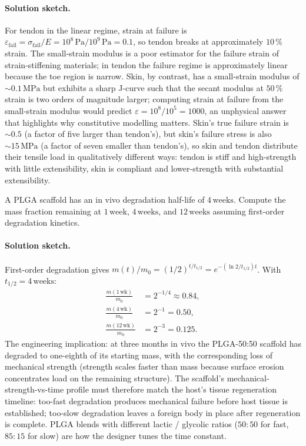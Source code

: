 \paragraph{Solution sketch.} For tendon in the linear regime, strain
at failure is $\varepsilon_{\text{fail}} = \sigma_{\text{fail}}/E
= 10^{8}\,\text{Pa} / 10^{9}\,\text{Pa} = 0.1$, so tendon breaks at
approximately $10\,\%$ strain. The small-strain modulus is a poor
estimator for the failure strain of strain-stiffening materials;
in tendon the failure regime is approximately linear because the
toe region is narrow. Skin, by contrast, has a small-strain modulus
of $\sim 0.1\,\text{MPa}$ but exhibits a sharp J-curve such that the
secant modulus at $50\,\%$ strain is two orders of magnitude
larger; computing strain at failure from the small-strain modulus
would predict $\varepsilon = 10^{8}/10^{5} = 1000$, an unphysical
answer that highlights why constitutive modelling matters. Skin's
true failure strain is $\sim 0.5$ (a factor of five larger than
tendon's), but skin's failure stress is also $\sim 15\,\text{MPa}$
(a factor of seven smaller than tendon's), so skin and tendon
distribute their tensile load in qualitatively different ways:
tendon is stiff and high-strength with little extensibility, skin
is compliant and lower-strength with substantial extensibility.

\begin{exercise}
A PLGA scaffold has an in vivo degradation half-life of $4\,\text{weeks}$.
Compute the mass fraction remaining at $1\,\text{week}$, $4\,\text{weeks}$,
and $12\,\text{weeks}$ assuming first-order degradation kinetics.
\end{exercise}

\paragraph{Solution sketch.} First-order degradation gives
$m(t)/m_0 = (1/2)^{t/t_{1/2}} = e^{-(\ln 2 / t_{1/2}) t}$.
With $t_{1/2} = 4\,\text{weeks}$:
\[
\begin{aligned}
\frac{m(1\,\text{wk})}{m_0} &= 2^{-1/4} \approx 0.84,\\
\frac{m(4\,\text{wk})}{m_0} &= 2^{-1} = 0.50,\\
\frac{m(12\,\text{wk})}{m_0} &= 2^{-3} = 0.125.
\end{aligned}
\]
The engineering implication: at three months in vivo the
PLGA-50:50 scaffold has degraded to one-eighth of its starting
mass, with the corresponding loss of mechanical strength (strength
scales faster than mass because surface erosion concentrates load
on the remaining structure). The scaffold's
mechanical-strength-vs-time profile must therefore match the host's
tissue regeneration timeline: too-fast degradation produces
mechanical failure before host tissue is established; too-slow
degradation leaves a foreign body in place after regeneration is
complete. PLGA blends with different lactic / glycolic ratios
($50{:}50$ for fast, $85{:}15$ for slow) are how the designer
tunes the time constant.

